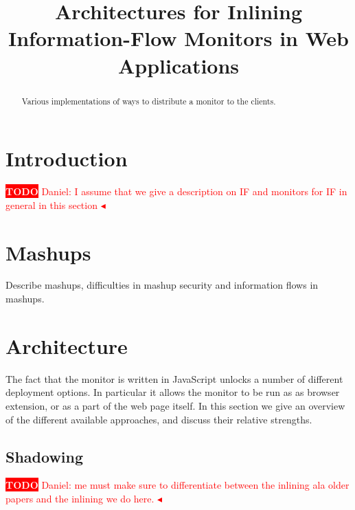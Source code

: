 \documentclass{llncs}
\title{Architectures for Inlining Information-Flow Monitors in Web Applications}
\newcommand{\todo}[1]{\colorbox{red}{\textcolor{white}{\sffamily\bfseries\scriptsize TODO}} \textcolor{red}{#1} \textcolor{red}{$\blacktriangleleft$}}
\begin{document}
\maketitle



\begin{abstract}
Various implementations of ways to distribute a monitor to the clients.
\end{abstract}










\section{Introduction}
\label{sec:intro}

\todo{Daniel: I assume that we give a description on IF and monitors for IF in general in this section}

\section{Mashups}
\label{sec:mash}

Describe mashups, difficulties in mashup security and information flows in mashups.

\section{Architecture}
\label{sec:arch}

The fact that the monitor is written in JavaScript unlocks a number of
different deployment options. In particular it allows the monitor to be run as
as browser extension, or as a part of the web page itself.  In this section we
give an overview of the different available approaches, and discuss their
relative strengths.


\subsection{Shadowing}
\todo{Daniel: me must make sure to differentiate between the inlining ala older papers and the inlining we do here.}
\end{document}

